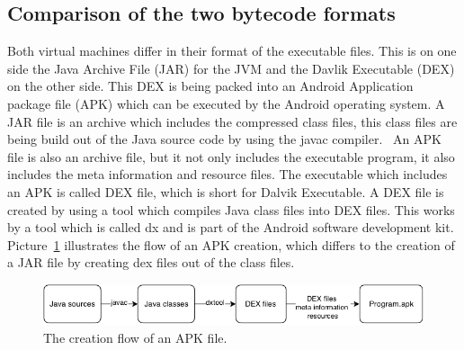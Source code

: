 \subsection{Comparison of the two bytecode formats}
\label{sec:comparison-of-the-two-bytecode-formats}
Both virtual machines differ in their format of the executable files.
This is on one side the Java Archive File (JAR) for the JVM and the Davlik Executable (DEX) on the other side.
This DEX is being packed into an Android Application package file (APK) which can be executed by the Android operating system.
A JAR file is an archive which includes the compressed class files, this class files are being build out of the Java source code by using the javac compiler.~\cite{pugh1999compressing} 
An APK file is also an archive file, but it not only includes the executable program, it also includes the meta information and resource files.
The executable which includes an APK is called DEX file, which is short for Dalvik Executable.
A DEX file is created by using a tool which compiles Java class files into DEX files.
This works by a tool which is called dx and is part of the Android software development kit.
Picture~\ref{fig:create-apk} illustrates the flow of an APK creation, which differs to the creation of a JAR file by creating dex files out of the class files.\\
\begin{figure}[h]
\begin{center}
\includegraphics[scale=0.55]{images/create-apk.png} 
\caption{The creation flow of an APK file.}
\label{fig:create-apk}
\end{center}
\end{figure}

